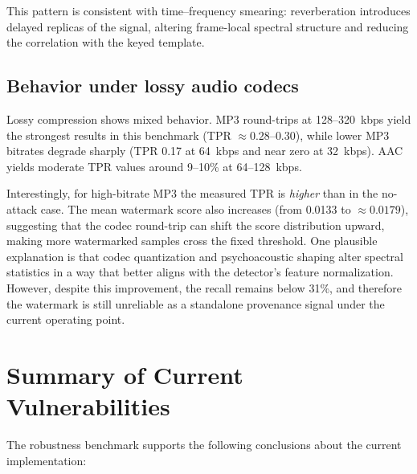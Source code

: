 This pattern is consistent with time--frequency smearing: reverberation introduces
delayed replicas of the signal, altering frame-local spectral structure and
reducing the correlation with the keyed template.

\subsection{Behavior under lossy audio codecs}
\label{subsec:wm-codecs}

Lossy compression shows mixed behavior. MP3 round-trips at 128--320~kbps yield
the strongest results in this benchmark (TPR $\approx 0.28$--$0.30$), while
lower MP3 bitrates degrade sharply (TPR 0.17 at 64~kbps and near zero at
32~kbps). AAC yields moderate TPR values around 9--10\% at 64--128~kbps.

Interestingly, for high-bitrate MP3 the measured TPR is \emph{higher} than in the
no-attack case. The mean watermark score also increases (from 0.0133 to
$\approx 0.0179$), suggesting that the codec round-trip can shift the score
distribution upward, making more watermarked samples cross the fixed threshold.
One plausible explanation is that codec quantization and psychoacoustic shaping
alter spectral statistics in a way that better aligns with the detector's feature
normalization. However, despite this improvement, the recall remains below 31\%,
and therefore the watermark is still unreliable as a standalone provenance signal
under the current operating point.

\section{Summary of Current Vulnerabilities}
\label{sec:wm-vuln-summary}

The robustness benchmark supports the following conclusions about the current
implementation:

